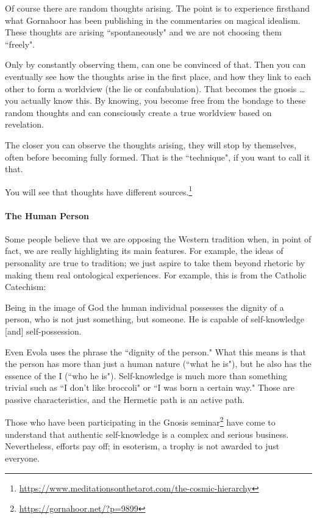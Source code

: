 \begin{quotex}
Of course there are random thoughts arising. The point is to experience firsthand what Gornahoor has been publishing in the commentaries on magical idealism. These thoughts are arising ``spontaneously" and we are not choosing them ``freely".

Only by constantly observing them, can one be convinced of that. Then you can eventually see how the thoughts arise in the first place, and how they link to each other to form a worldview (the lie or confabulation). That becomes the gnosis … you actually know this. By knowing, you become free from the bondage to these random thoughts and can consciously create a true worldview based on revelation.

The closer you can observe the thoughts arising, they will stop by themselves, often before becoming fully formed. That is the ``technique", if you want to call it that.

You will see that thoughts have different sources.\footnote{\url{https://www.meditationsonthetarot.com/the-cosmic-hierarchy}}

\end{quotex}
\paragraph{The Human Person}
Some people believe that we are opposing the Western tradition when, in point of fact, we are really highlighting its main features. For example, the ideas of personality are true to tradition; we just aspire to take them beyond rhetoric by making them real ontological experiences. For example, this is from the Catholic Catechism:

\begin{quotex}
Being in the image of God the human individual possesses the dignity of a person, who is not just something, but someone. He is capable of self-knowledge [and] self-possession. 

\end{quotex}
Even Evola uses the phrase the ``dignity of the person." What this means is that the person has more than just a human nature (``what he is"), but he also has the essence of the I (``who he is"). Self-knowledge is much more than something trivial such as ``I don't like broccoli" or ``I was born a certain way." Those are passive characteristics, and the Hermetic path is an active path.

Those who have been participating in the Gnosis seminar\footnote{\url{https://gornahoor.net/?p=9899}} have come to understand that authentic self-knowledge is a complex and serious business. Nevertheless, efforts pay off; in esoterism, a trophy is not awarded to just everyone.

